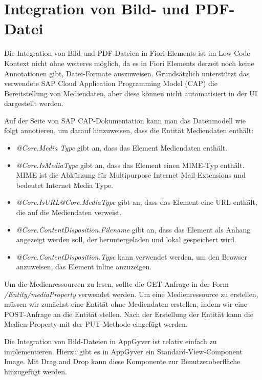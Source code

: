 \section{Integration von Bild- und PDF-Datei}

Die Integration von Bild und PDF-Dateien in Fiori Elements ist im Low-Code Kontext nicht ohne weiteres möglich, da es in Fiori Elements derzeit noch keine Annotationen gibt, Datei-Formate auszuweisen. Grundsätzlich unterstützt das verwendete SAP Cloud Application Programming Model (CAP) die Bereitstellung von Mediendaten\cite{sapc:smd}, aber diese können nicht automatisiert in der UI dargestellt werden.

Auf der Seite von SAP CAP-Dokumentation kann man das Datenmodell wie folgt annotieren, um darauf hinzuweisen, dass die Entität Mediendaten enthält:

\begin{itemize}[noitemsep]
\item \textit{@Core.Media Type} gibt an, dass das Element Mediendaten enthält. 
\item \textit{@Core.IsMediaType} gibt an, dass das Element einen MIME-Typ enthält. MIME ist die Abkürzung für Multipurpose Internet Mail Extensions und bedeutet Internet Media Type\cite{mi:pag}.
\item \textit{@Core.IsURL@Core.MediaType} gibt an, dass das Element eine URL enthält, die auf die Mediendaten verweist.
\item \textit{@Core.ContentDisposition.Filename} gibt an, dass das Element als Anhang angezeigt werden soll, der heruntergeladen und lokal gespeichert wird.
\item \textit{@Core.ContentDisposition.Type} kann verwendet werden, um den Browser anzuweisen, das Element inline anzuzeigen.
\end{itemize}

Um die Medienressourcen zu lesen, sollte die GET-Anfrage in der Form \textit{/Entity/mediaProperty} verwendet werden. Um eine Medienressource zu erstellen, müssen wir zunächst eine Entität ohne Mediendaten erstellen, indem wir eine POST-Anfrage an die Entität stellen. Nach der Erstellung der Entität kann die Medien-Property mit der PUT-Methode eingefügt werden\cite{sapc:smd}. 

Die Integration von Bild-Dateien in AppGyver ist relativ einfach zu implementieren. Hierzu gibt es in AppGyver ein Standard-View-Component Image. Mit Drag and Drop kann diese Komponente zur Benutzeroberfläche hinzugefügt werden. 

